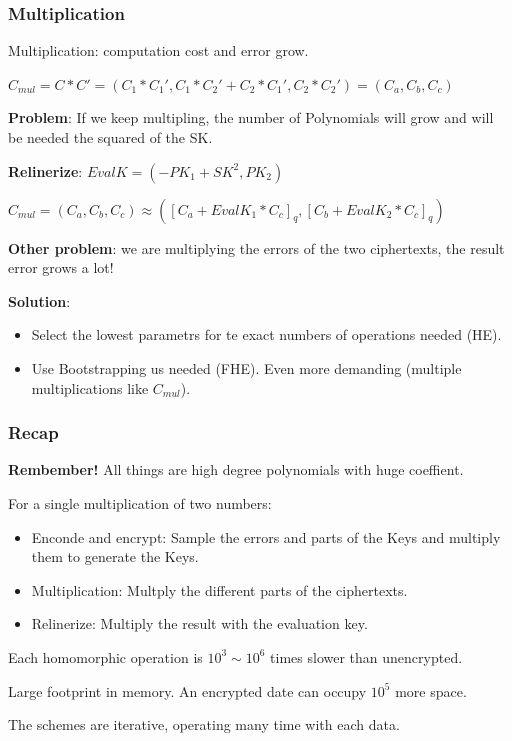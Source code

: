 \documentclass[10pt,handout]{beamer}
\begin{document}
\begin{frame}
\frametitle{Multiplication}

    Multiplication: computation cost and error grow.

    $C_{mul} = C*C' = (C_1*C_1',C_1*C_2'+C_2*C_1', C_2*C_2') = (C_a,C_b,C_c)$

    \textbf{Problem}: If we keep multipling, the number of Polynomials will grow and will be needed
    the squared of the SK.

    \textbf{Relinerize}:
    $EvalK = (-PK_1+SK^2, PK_2)$

    $C_{mul} = (C_a, C_b, C_c)\approx ([C_a+EvalK_1*C_c]_q, [C_b+EvalK_2*C_c]_q)$

    \textbf{Other problem}: we are multiplying the errors of the two ciphertexts, the result error
    grows a lot!
\vspace{-0.1cm}

    \textbf{Solution}: \vspace{-0.3cm}
    \begin{itemize} \vspace{-0.2cm}
        \item Select the lowest parametrs for te exact numbers of operations needed (HE). \vspace{-0.2cm}
        \item Use Bootstrapping us needed (FHE). Even more demanding (multiple multiplications like $C_{mul}$).
    \end{itemize}
\end{frame}

\begin{frame}
\frametitle{Recap}

    \textbf{Rembember!} All things are high degree polynomials with huge coeffient.

For a single multiplication of two numbers:
\begin{itemize}
    \item Enconde and encrypt: Sample the errors and parts of the Keys and multiply them to generate the Keys.
    \item Multiplication: Multply the different parts of the ciphertexts.
    \item Relinerize: Multiply the result with the evaluation key.
\end{itemize}

Each homomorphic operation is $10^3 \sim 10^6$ times slower than unencrypted.
\pause

Large footprint in memory.
An encrypted date can occupy $10^5$ more space.

\pause
The schemes are iterative, operating many time with each data.
\pause



\end{frame}
\end{document}
